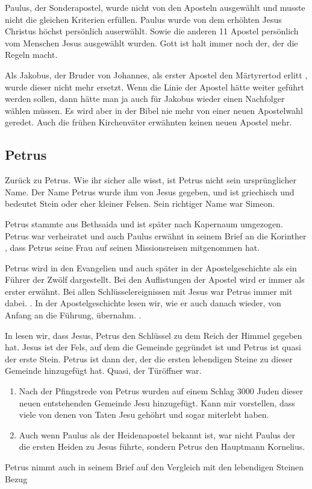 \documentclass[fontsize=16pt]{mybib}
\begin{document}
Paulus, der Sonderapostel, wurde nicht von den Aposteln ausgewählt und musste nicht die gleichen Kriterien erfüllen. Paulus wurde von dem erhöhten Jesus Christus höchst persönlich auserwählt. Sowie die anderen 11 Apostel persönlich vom Menschen Jesus ausgewählt wurden. Gott ist halt immer noch der, der die Regeln macht.

Als Jakobus, der Bruder von Johannes, als erster Apostel den Märtyrertod erlitt , wurde dieser nicht mehr ersetzt. Wenn die Linie der Apostel hätte weiter geführt werden sollen, dann hätte man ja auch für Jakobus wieder einen Nachfolger wählen müssen. Es wird aber in der Bibel nie mehr von einer neuen Apostelwahl geredet. Auch die frühen Kirchenväter erwähnten keinen neuen Apostel mehr.

\subsection{Petrus}
Zurück zu Petrus. Wie ihr sicher alle wisst, ist Petrus nicht sein ursprünglicher Name. Der Name Petrus wurde ihm von Jesus gegeben, und ist griechisch und bedeutet Stein oder eher kleiner Felsen.  Sein richtiger Name war Simeon.

Petrus stammte aus Bethsaida  und ist später nach Kapernaum umgezogen. Petrus war verheiratet  und auch Paulus erwähnt in seinem Brief an die Korinther , dass Petrus seine Frau auf seinen Missionsreisen mitgenommen hat.

Petrus wird in den Evangelien und auch später in der Apostelgeschichte als ein Führer der Zwölf dargestellt. Bei den Auflistungen der Apostel wird er immer als erster erwähnt. Bei allen Schlüsselereignissen mit Jesus war Petrus immer mit dabei. .
In der Apostelgeschichte lesen wir, wie er auch danach wieder, von Anfang an die Führung, übernahm. .

In  lesen wir, dass Jesus, Petrus den Schlüssel zu dem Reich der Himmel gegeben hat. Jesus ist der Fels, auf dem die Gemeinde gegründet ist und Petrus ist quasi der erste Stein. Petrus ist dann der, der die ersten lebendigen Steine zu dieser Gemeinde hinzugefügt hat. Quasi, der Türöffner war. 
\begin{enumerate}
    \item Nach der Pfingstrede von Petrus  wurden auf einem Schlag 3000 Juden dieser neuen entstehenden Gemeinde Jesu hinzugefügt. Kann mir vorstellen, dass viele von denen von Taten Jesu gehöhrt und sogar miterlebt haben. 
    \item Auch wenn Paulus als der Heidenapostel bekannt ist, war nicht Paulus der die ersten Heiden zu Jesus führte, sondern Petrus den Hauptmann Kornelius. 
\end{enumerate}
Petrus nimmt auch in seinem Brief auf den Vergleich mit den lebendigen Steinen Bezug  
\end{document}
